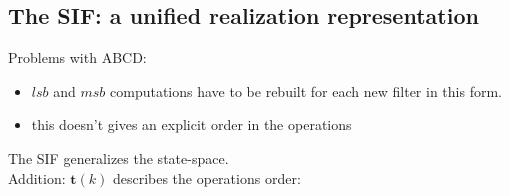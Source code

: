 



\subsection{The SIF: a unified realization representation }

\begin{frame}
	Problems with ABCD:
	\begin{itemize}
		\item $lsb$ and $msb$ computations have to be rebuilt for each new filter in this form.
		\item this doesn't gives an explicit order in the operations
	\end{itemize}

	The SIF generalizes the state-space.\\
	Addition: $\boldsymbol{t}(k)$ describes the operations order:


\end{frame}
